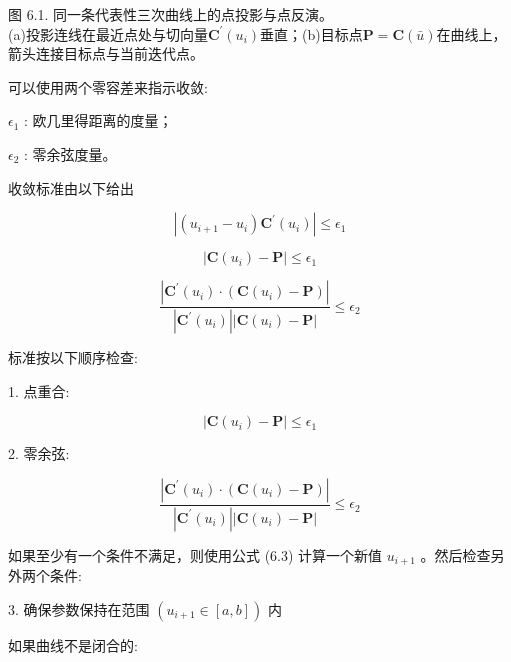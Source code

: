 \documentclass[../main.tex]{subfiles}
\begin{document}
\begin{center}
\begin{minipage}{25.2cm}
\vspace*{.6\baselineskip}
\centering
{}
\par\smallskip
图 6.1. 同一条代表性三次曲线上的点投影与点反演。\\
(a)投影连线在最近点处与切向量$\mathbf C^{\prime}(u_i)$垂直；(b)目标点$\mathbf P=\mathbf C(\bar u)$在曲线上，箭头连接目标点与当前迭代点。
\end{minipage}
\end{center}

可以使用两个零容差来指示收敛:

\({\epsilon }_{1}\) : 欧几里得距离的度量；

\({\epsilon }_{2}\) : 零余弦度量。



收敛标准由以下给出

\[
\left| {\left( {{u}_{i + 1} - {u}_{i}}\right) {\mathbf{C}}^{\prime }\left( {u}_{i}\right) }\right|  \leq  {\epsilon }_{1}
\]

\[
\left| {\mathbf{C}\left( {u}_{i}\right)  - \mathbf{P}}\right|  \leq  {\epsilon }_{1}
\]

\[
\frac{\left| {\mathbf{C}}^{\prime }\left( {u}_{i}\right)  \cdot  \left( \mathbf{C}\left( {u}_{i}\right)  - \mathbf{P}\right) \right| }{\left| {{\mathbf{C}}^{\prime }\left( {u}_{i}\right) }\right| \left| {\mathbf{C}\left( {u}_{i}\right)  - \mathbf{P}}\right| } \leq  {\epsilon }_{2} \tag{6.4}
\]

标准按以下顺序检查:

1. 点重合:

\[
\left| {\mathbf{C}\left( {u}_{i}\right)  - \mathbf{P}}\right|  \leq  {\epsilon }_{1}
\]

2. 零余弦:

\[
\frac{\left| {\mathbf{C}}^{\prime }\left( {u}_{i}\right)  \cdot  \left( \mathbf{C}\left( {u}_{i}\right)  - \mathbf{P}\right) \right| }{\left| {{\mathbf{C}}^{\prime }\left( {u}_{i}\right) }\right| \left| {\mathbf{C}\left( {u}_{i}\right)  - \mathbf{P}}\right| } \leq  {\epsilon }_{2}
\]

如果至少有一个条件不满足，则使用公式 (6.3) 计算一个新值 \({u}_{i + 1}\) 。然后检查另外两个条件:

3. 确保参数保持在范围 \(\left( {{u}_{i + 1} \in  \left\lbrack  {a,b}\right\rbrack  }\right)\) 内

如果曲线不是闭合的:
\end{document}
